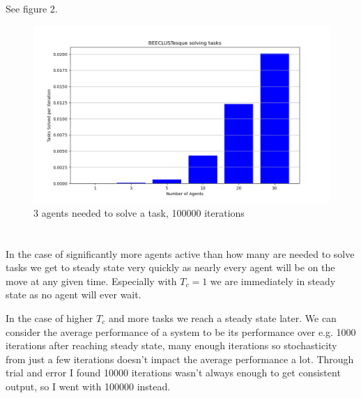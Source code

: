 \documentclass{article}
\begin{document}
\section{}
See figure 2.
\begin{figure}
	\includegraphics[width=\textwidth]{3_capacity.png}
	\caption{3 agents needed to solve a task, 100000 iterations}
	\label{fig:environment}
\end{figure}
\section{}
In the case of significantly more agents active than how many are needed to solve tasks we get to steady state very quickly as nearly every agent will be on the move at any given time. Especially with $T_c = 1$ we are immediately in steady state as no agent will ever wait.

In the case of higher $T_c$ and more tasks we reach a steady state later. We can consider the average performance of a system to be its performance over e.g. 1000 iterations after reaching steady state, many enough iterations so stochasticity from just a few iterations doesn't impact the average performance a lot. Through trial and error I found 10000 iterations wasn't always enough to get consistent output, so I went with 100000 instead.
\end{document}

